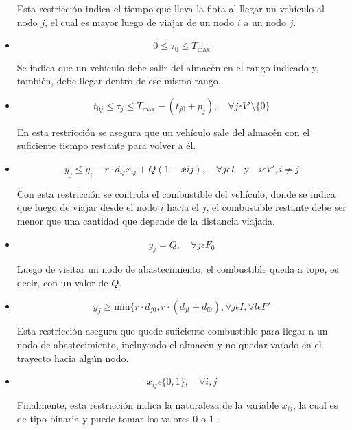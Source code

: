 \documentclass[letter, 10pt]{article}
\begin{document}
\begin{itemize}
Esta restricción indica el tiempo que lleva la flota al llegar un vehículo al nodo \(j\), el cual es mayor
luego de viajar de un nodo \(i\) a un nodo \(j\).

\item
\begin{equation*}
0 \leq \tau_0 \leq T_{\mbox{max}}
\end{equation*}

Se indica que un vehículo debe salir del almacén en el rango indicado y, también, debe llegar dentro de ese mismo rango.

\item
\begin{equation*}
t_{0j} \leq \tau_j \leq T_{\mbox{max}} - (t_{j0} + p_j), \quad \forall j \epsilon V' \setminus \lbrace 0 \rbrace
\end{equation*}

En esta restricción se asegura que un vehículo sale del almacén con el suficiente tiempo restante para volver a él.

\item
\begin{equation*}
y_j \leq y_i - r \cdot d_{ij} x_{ij} + Q (1-x{ij}), \quad \forall j \epsilon I \quad \mbox{y} \quad 
		i \epsilon V', i \neq j
\end{equation*}

Con esta restricción se controla el combustible del vehículo, donde se indica que luego de viajar desde el nodo \(i\)
hacia el \(j\), el combustible restante debe ser menor que una cantidad que depende de la distancia viajada.

\item
\begin{equation*}
y_j = Q, \quad \forall j \epsilon F_0
\end{equation*}

Luego de visitar un nodo de abastecimiento, el combustible queda a tope, es decir, con un valor de \(Q\).

\item
\begin{equation*}
y_j \geq \mbox{min}\lbrace r \cdot d_{j0}, r \cdot (d_{jl} + d_{l0}), \forall j \epsilon I, \forall l \epsilon F'
\end{equation*}

Esta restricción asegura que quede suficiente combustible para llegar a un nodo de abastecimiento, incluyendo el almacén
y no quedar varado en el trayecto hacia algún nodo.

\item
\begin{equation*}
x_{ij} \epsilon \lbrace 0, 1 \rbrace, \quad \forall i,j
\end{equation*}

Finalmente, esta restricción indica la naturaleza de la variable \(x_{ij}\), la cual es de tipo binaria y puede tomar los valores \(0\) o \(1\).

\end{itemize}
\end{document}
